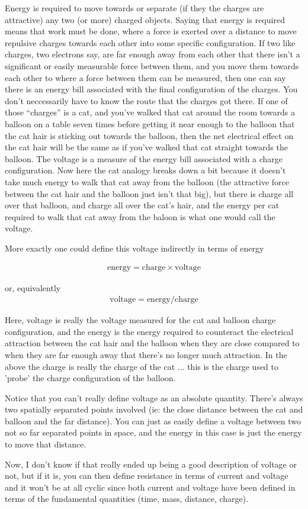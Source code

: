 \documentclass{article}
\begin{document}
Energy is required 
to move towards or separate (if they the charges are attractive) any two (or more) charged objects.
Saying that energy is required means that work must be done, where a force is exerted over a distance to move repulsive
charges towards each other into some specific configuration.  If two like charges, two electrons say, are far enough away
from each other that there isn't a significant or easily measurable force between them, and you move them towards each other
to where a force between them can be measured, then one can say there is an energy bill associated with the final configuration
of the charges.  You don't neccessarily have to know the route that the charges got there.  If one of those ``charges'' is a
cat, and you've walked that cat around the room towards a balloon on a table seven times before getting it near enough 
to the balloon that the cat hair is sticking out towards the balloon, then the net electrical effect on the cat hair will 
be the same as if you've walked that cat straight towards the balloon.  The voltage is a measure of the energy bill associated
with a charge configuration.  Now here the cat analogy breaks down a bit because it doesn't take much energy to walk that cat
away from the balloon (the attractive force between the cat hair and the balloon just isn't that big), but there is charge
all over that balloon, and charge all over the cat's hair, and the energy per cat required to walk that cat away from the baloon
is what one would call the voltage.

More exactly one could define this voltage indirectly in terms of energy

\begin{align*}
\text{energy} = \text{charge} \times \text{voltage}
\end{align*}

or, equivalently
\begin{align*}
\text{voltage} = \text{energy} / \text{charge}
\end{align*}

Here, voltage is really the voltage measured for the cat and balloon charge configuration, and the energy is 
the energy required to counteract the electrical attraction between the cat hair and the balloon when they are close
compared to when they are far enough away that there's no longer much attraction.  In the above the charge is really
the charge of the cat ... this is the charge used to 'probe' the charge configuration of the balloon.

Notice that you can't really define voltage as an absolute quantity.  There's always two spatially separated points 
involved (ie: the close distance between the cat and balloon and the far distance).  You can just as easily define a
voltage between two not so far separated points in space, and the energy in this case is just the energy to move
that distance.

Now, I don't know if that really ended up being a good description of voltage or not, but if it is, you can then define
resistance in terms of current and voltage and it won't be at all cyclic since both current and voltage have been defined
in terms of the fundamental quantities (time, mass, distance, charge).
\end{document}

